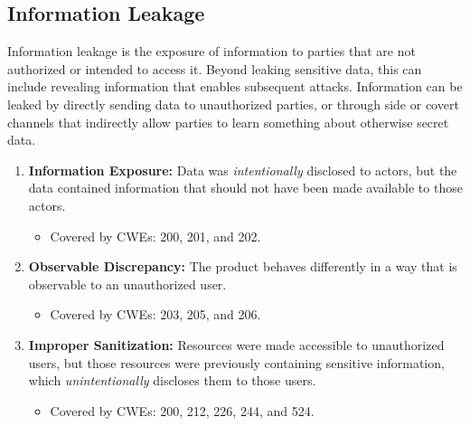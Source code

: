 \documentclass{article}
\begin{document}
\subsection{Information Leakage}
Information leakage is the exposure of information to parties that are not authorized or intended to access it. Beyond leaking sensitive data, this can include revealing information that enables subsequent attacks. Information can be leaked by directly sending data to unauthorized parties, or through side or covert channels that indirectly allow parties to learn something about otherwise secret data. 
\begin{enumerate}
    \item \textbf{Information Exposure:} Data was \textit{intentionally} disclosed to actors, but the data contained information that should not have been made available to those actors.
    \begin{itemize}
        \item Covered by CWEs: 200, 201, and 202.
    \end{itemize}
    
    \item \textbf{Observable Discrepancy:} The product behaves differently in a way that is observable to an unauthorized user.
    \begin{itemize}
        \item Covered by CWEs: 203, 205, and 206.
    \end{itemize}
    
    \item \textbf{Improper Sanitization:} Resources were made accessible to unauthorized users, but those resources were previously containing sensitive information, which \textit{unintentionally} discloses them to those users.
    \begin{itemize}
        \item Covered by CWEs: 200, 212, 226, 244, and 524.
    \end{itemize}
\end{enumerate}   
\end{document}

